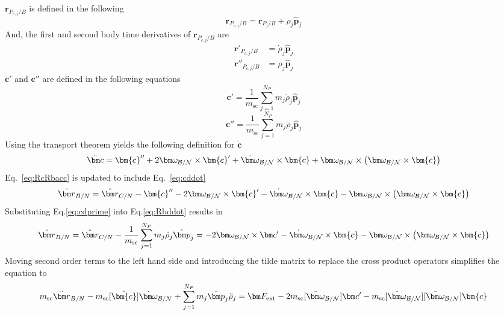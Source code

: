 $\bm{r}_{P_{c,j}/B}$ is defined in the following
\begin{equation}
	\bm{r}_{P_{c,j}/B} = \bm{r}_{P_{j}/B} + \rho_j \hat{\bm p}_j
\end{equation}
And, the first and second body time derivatives of $\bm{r}_{P_{c,j}/B}$ are
\begin{align}
	\bm{r}'_{P_{c,j}/B} &= \dot{\rho}_j \hat{\bm p}_j
	\\
	\bm{r}''_{P_{c,j}/B} &= \ddot{\rho}_j \hat{\bm p}_j
\end{align}
$\bm{c}'$ and $\bm{c}''$ are defined in the following equations
\begin{equation}
	\bm{c}' = \frac{1}{m_{\text{sc}}}\sum_{j=1}^{N_{P}}m_j\dot{\rho}_j \hat{\bm p}_j
	\label{eq:cprime}
\end{equation}
\begin{equation}
	\bm{c}'' = \frac{1}{m_{\text{sc}}}\sum_{j=1}^{N_{P}}m_j\ddot{\rho}_j \hat{\bm p}_j
	\label{eq:cdprime}
\end{equation}
Using the transport theorem\cite{schaub} yields the following definition for $\ddot{\bm c}$
\begin{equation}
	\ddot{\bm c} = \bm{c}'' + 2\bm\omega_{\cal B/N}\times\bm{c}'+\dot{\bm\omega}_{\cal B/N}\times\bm{c}+\bm\omega_{\cal B/N}\times\left(\bm\omega_{\cal B/N}\times\bm{c}\right)
	\label{eq:cddot}
\end{equation}
Eq.~\eqref{eq:RcRbacc} is updated to include Eq.~\eqref{eq:cddot}
\begin{equation}
	\ddot{\bm r}_{B/N} = \ddot{\bm r}_{C/N}-\bm{c}'' - 2\bm\omega_{\cal B/N}\times\bm{c}'-\dot{\bm\omega}_{\cal B/N}\times\bm{c}-\bm\omega_{\cal B/N}\times\left(\bm\omega_{\cal B/N}\times\bm{c}\right)
	\label{eq:Rbddot}
\end{equation}
Substituting Eq.\eqref{eq:cdprime} into Eq.\eqref{eq:Rbddot} results in
\begin{equation}
	\ddot{\bm r}_{B/N} = \ddot{\bm r}_{C/N}-\frac{1}{m_{\text{sc}}}\sum_{j=1}^{N_{P}}m_j\ddot{\rho}_j \hat{\bm p}_j =
	- 2\bm\omega_{\cal B/N}\times\bm c'
	-\dot{\bm\omega}_{\cal B/N}\times\bm{c}-\bm\omega_{\cal B/N}\times\left(\bm\omega_{\cal B/N}\times\bm{c}\right)
	\label{eq:Rbddot2}
\end{equation}
Moving second order terms to the left hand side and introducing the tilde matrix\cite{schaub} to replace the cross product operators simplifies the equation to
\begin{equation}
	m_{\text{sc}} \ddot{\bm r}_{B/N}-m_{\text{sc}} [\tilde{\bm{c}}] \dot{\bm\omega}_{\cal B/N} +\sum_{j=1}^{N_{P}}m_j \hat{\bm p}_j \ddot{\rho}_j = \bm F_{\text{ext}}	- 2 m_{\text{sc}} [\tilde{\bm\omega}_{\cal B/N}] \bm c'
	- m_{\text{sc}} [\tilde{\bm\omega}_{\cal B/N}][\tilde{\bm\omega}_{\cal B/N}]\bm{c}
	\label{eq:Rbddot3}
\end{equation}


